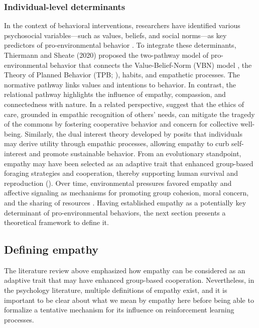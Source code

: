 \subsubsection{Individual-level determinants}
In the context of behavioral interventions, researchers have identified various psychosocial variables—such as values, beliefs, and social norms—as key predictors of pro-environmental behavior \cite{fornaraExtendedValueBeliefNormTheory2020,guoResidentialElectricityConsumption2018,liWhatInfluencesIndividuals2019,sussmanProEnvironmentalValuesMatter2016}. To integrate these determinants, Thiermann and Sheate (2020) proposed the two-pathway model of pro-environmental behavior that connects the Value-Belief-Norm (VBN) model \cite{sternValuebeliefnormTheorySupport1999}, the Theory of Planned Behavior (TPB; \cite{ajzenTheoryPlannedBehavior1991}), habits, and empathetic processes. The normative pathway links values and intentions to behavior. In contrast, the relational pathway highlights the influence of empathy, compassion, and connectedness with nature.
In a related perspective, \cite{moreno-casasEthicsCareTragedy2021} suggest that the ethics of care, grounded in empathic recognition of others' needs, can mitigate the tragedy of the commons by fostering cooperative behavior and concern for collective well-being. Similarly, the dual interest theory developed by \cite{lynneTheoreticalFoundationEmpathy2016} posits that individuals may derive utility through empathic processes, allowing empathy to curb self-interest and promote sustainable behavior.
From an evolutionary standpoint, empathy may have been selected as an adaptive trait that enhanced group-based foraging strategies and cooperation, thereby supporting human survival and reproduction (\cite{tomaselloTwoKeySteps2012}). Over time, environmental pressures favored empathy and affective signaling as mechanisms for promoting group cohesion, moral concern, and the sharing of resources \cite{cuffEmpathyReviewConcept2016,decetyEmergenceEmpathyDevelopmental2021,tomaselloOriginsHumanCooperation2013}. Having established empathy as a potentially key determinant of pro-environmental behaviors, the next section presents a theoretical framework to define it.



\subsection{Defining empathy}
The literature review above emphasized how empathy can be considered as an adaptive trait that may have enhanced group-based cooperation. Nevertheless, in the psychology literature, multiple definitions of empathy exist, and it is important to be clear about what we mean by empathy here before being able to formalize a tentative mechanism for its influence on reinforcement learning processes.

